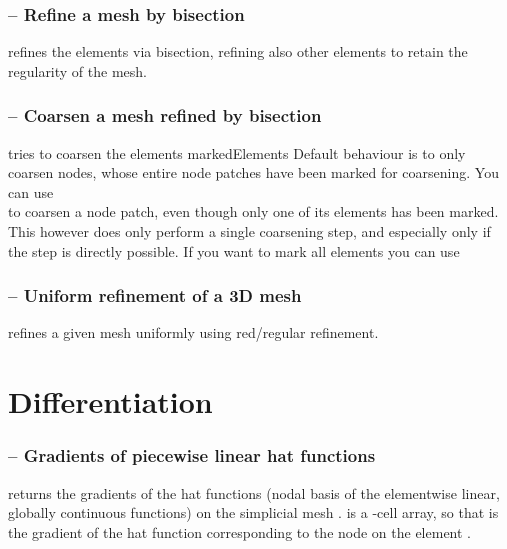 \documentclass[twoside,11pt,a4paper]{article} %
\begin{document}
\subsubsection*{\texorpdfstring{ --}{} Refine a mesh by bisection}
 refines the elements  via bisection, refining also other elements to retain the regularity of the mesh.

\subsubsection*{\texorpdfstring{ --}{} Coarsen a mesh refined by bisection}
 tries to coarsen the elements markedElements
Default behaviour is to only coarsen nodes, whose entire node patches have been marked for coarsening. You can use 
\\  to coarsen a node patch, even though only one of its elements has been marked. This however does only perform a single coarsening step, and especially only if the step is directly possible. If you want to mark all elements you can use \\


\subsubsection*{\texorpdfstring{ --}{} Uniform refinement of a 3D mesh}
 refines a given mesh uniformly using red/regular refinement.

\section{Differentiation}
\subsubsection*{\texorpdfstring{ --}{} Gradients of piecewise linear hat functions}
  returns the gradients of the hat functions (nodal basis of the elementwise linear, globally continuous functions) on the simplicial mesh .  is a -cell array, so that  is the gradient of the hat function corresponding to the node  on the element .
\end{document}
